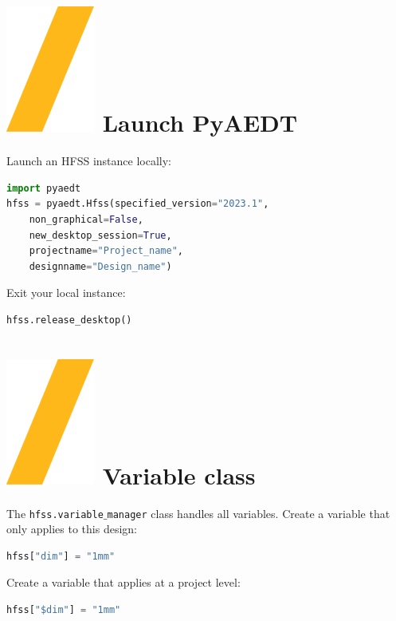 \documentclass[9pt,landscape]{article}
\begin{document}
\begin{multicols}{3}
\setlength{\premulticols}{1pt}
\setlength{\postmulticols}{1pt}
\setlength{\multicolsep}{1pt}
\setlength{\columnsep}{2pt}

\section{\includegraphics[height=\fontcharht\font`\S]{slash.png} Launch PyAEDT}
Launch an HFSS instance locally:
\begin{lstlisting}[language=Python]
import pyaedt
hfss = pyaedt.Hfss(specified_version="2023.1",
	non_graphical=False,
	new_desktop_session=True,
	projectname="Project_name",
	designname="Design_name")
\end{lstlisting}
Exit your local instance:
\begin{lstlisting}[language=Python]
hfss.release_desktop()
\end{lstlisting}
\section{\includegraphics[height=\fontcharht\font`\S]{slash.png} Variable class}
The \texttt{hfss.variable$\_$manager} class handles all variables.
\newline
Create a variable that only applies to this design:
\begin{lstlisting}[language=Python]
hfss["dim"] = "1mm"
\end{lstlisting}
Create a variable that applies at a project level:
\begin{lstlisting}[language=Python]
hfss["$dim"] = "1mm"
\end{lstlisting}

\end{multicols}
\end{document}
